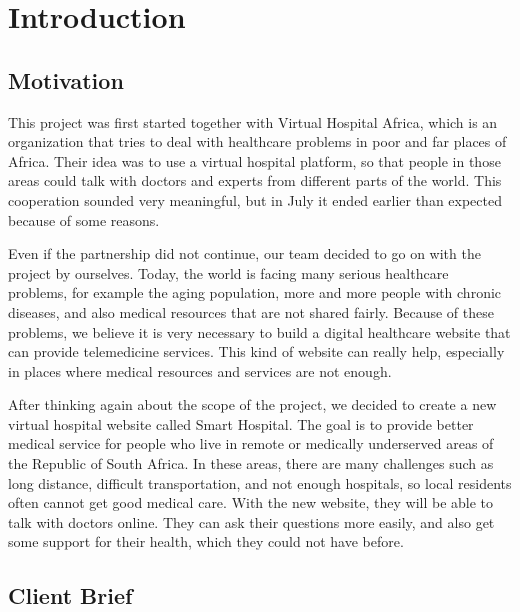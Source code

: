 %
%
\chapter{Introduction}
\label{chap:intro}


\section{Motivation}
\label{sec:sec01}

This project was first started together with Virtual Hospital Africa, which is an organization that tries to deal with healthcare problems in poor and far places of Africa. Their idea was to use a virtual hospital platform, so that people in those areas could talk with doctors and experts from different parts of the world. This cooperation sounded very meaningful, but in July it ended earlier than expected because of some reasons.

Even if the partnership did not continue, our team decided to go on with the project by ourselves. Today, the world is facing many serious healthcare problems, for example the aging population, more and more people with chronic diseases, and also medical resources that are not shared fairly. Because of these problems, we believe it is very necessary to build a digital healthcare website that can provide telemedicine services. This kind of website can really help, especially in places where medical resources and services are not enough.

After thinking again about the scope of the project, we decided to create a new virtual hospital website called Smart Hospital. The goal is to provide better medical service for people who live in remote or medically underserved areas of the Republic of South Africa. In these areas, there are many challenges such as long distance, difficult transportation, and not enough hospitals, so local residents often cannot get good medical care. With the new website, they will be able to talk with doctors online. They can ask their questions more easily, and also get some support for their health, which they could not have before.

\section{Client Brief}
\label{sec:sec02}

